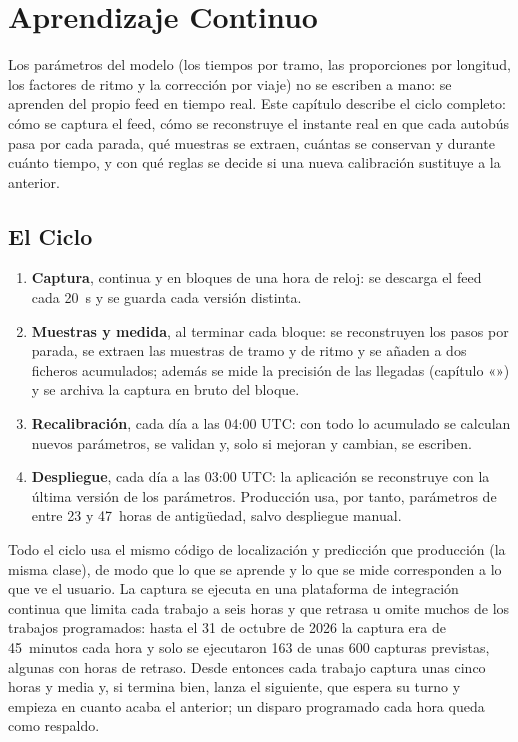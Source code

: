 \chapter{Aprendizaje Continuo}
\label{cap:aprendizaje}

Los parámetros del modelo (los tiempos por tramo, las proporciones por longitud, los factores de ritmo y la corrección por viaje) no se
escriben a mano: se aprenden del propio feed en tiempo real. Este capítulo describe el ciclo completo: cómo se captura
el feed, cómo se reconstruye el instante real en que cada autobús pasa por cada parada, qué muestras se extraen, cuántas
se conservan y durante cuánto tiempo, y con qué reglas se decide si una nueva calibración sustituye a la anterior.

\section{El Ciclo}
\label{sec:ciclo}

\begin{enumerate}
  \item \textbf{Captura}, continua y en bloques de una hora de reloj: se descarga el feed cada 20~s y se guarda cada
        versión distinta.
  \item \textbf{Muestras y medida}, al terminar cada bloque: se reconstruyen los pasos por parada, se extraen las
        muestras de tramo y de ritmo y se añaden a dos ficheros acumulados; además se mide la precisión de las
        llegadas (capítulo «») y se archiva la captura en bruto del bloque.
  \item \textbf{Recalibración}, cada día a las 04:00 UTC: con todo lo acumulado se calculan nuevos parámetros, se
        validan y, solo si mejoran y cambian, se escriben.
  \item \textbf{Despliegue}, cada día a las 03:00 UTC: la aplicación se reconstruye con la última versión de los
        parámetros. Producción usa, por tanto, parámetros de entre 23 y 47~horas de antigüedad, salvo despliegue manual.
\end{enumerate}

Todo el ciclo usa el mismo código de localización y predicción que producción (la misma clase), de modo que lo que se
aprende y lo que se mide corresponden a lo que ve el usuario. La captura se ejecuta en una plataforma de integración
continua que limita cada trabajo a seis horas y que retrasa u omite muchos de los trabajos programados: hasta el 31 de octubre de 2026
la captura era de 45~minutos cada hora y solo se ejecutaron 163 de unas 600 capturas previstas, algunas con horas de
retraso. Desde entonces cada trabajo captura unas cinco horas y media y, si termina bien, lanza el siguiente, que
espera su turno y empieza en cuanto acaba el anterior; un disparo programado cada hora queda como respaldo.

